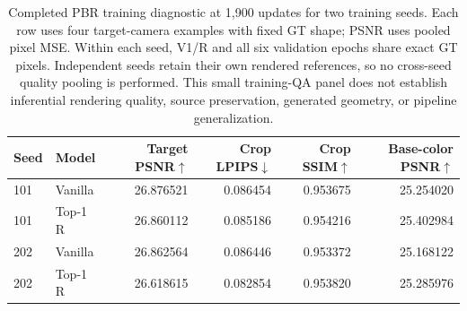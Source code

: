 \begin{table}[t]
\centering\small
\setlength{\tabcolsep}{4pt}
\begin{tabular}{llrrrr}
\toprule
Seed&Model&Target PSNR$\uparrow$&Crop LPIPS$\downarrow$&Crop SSIM$\uparrow$&Base-color PSNR$\uparrow$\\
\midrule
101&Vanilla&26.876521&0.086454&0.953675&25.254020\\
101&Top-1 R&26.860112&0.085186&0.954216&25.402984\\
202&Vanilla&26.862564&0.086446&0.953372&25.168122\\
202&Top-1 R&26.618615&0.082854&0.953820&25.285976\\
\bottomrule
\end{tabular}
\caption{Completed PBR training diagnostic at 1,900 updates for two
training seeds. Each row uses four target-camera examples with fixed GT
shape; PSNR uses pooled pixel MSE. Within each seed, V1/R and all six
validation epochs share exact GT pixels. Independent seeds retain their
own rendered references, so no cross-seed quality pooling is performed.
This small training-QA panel does not establish inferential rendering
quality, source preservation, generated geometry, or pipeline generalization.}
\label{tab:pbr-training-two-seed}
\end{table}
